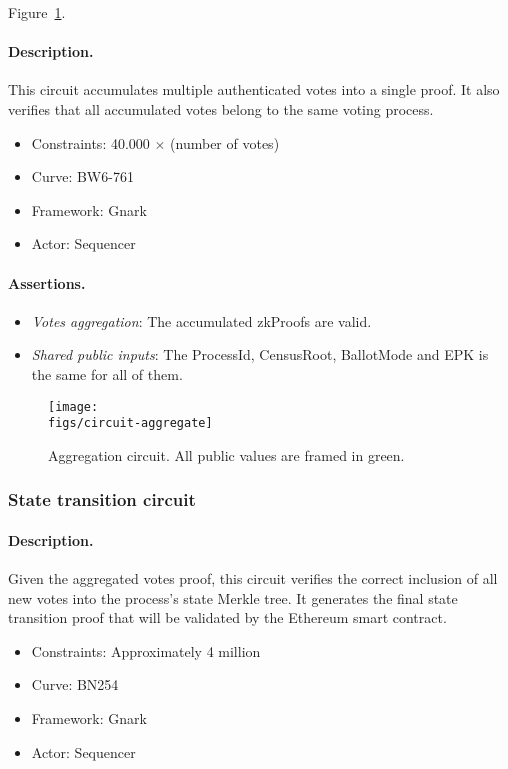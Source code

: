 Figure~\ref{fig:circuit-aggregate}.

\paragraph{Description.} This circuit accumulates multiple authenticated votes into a single proof. It also verifies that all accumulated votes belong to the same voting process.

\begin{itemize}
	\item Constraints: 40.000 $\times$ (number of votes)
	\item Curve: BW6-761
	\item Framework: Gnark
	\item Actor: Sequencer
\end{itemize}

\paragraph{Assertions.}

\begin{itemize}
	\item \emph{Votes aggregation}: The accumulated zkProofs are valid.
	\item \emph{Shared public inputs}: The ProcessId, CensusRoot, BallotMode and EPK is the same for all of them.
\end{itemize}

\begin{figure}[h]
	\centerline{\texttt{[image: \\figs/circuit-aggregate]}}
	\caption{Aggregation circuit. All public values are framed in green.}
	\label{fig:circuit-aggregate}
\end{figure}


\subsubsection{State transition circuit}

\paragraph{Description.} Given the aggregated votes proof, this circuit verifies the correct inclusion of all new votes into the process's state Merkle tree. It generates the final state transition proof that will be validated by the Ethereum smart contract.

\begin{itemize}
	\item Constraints: Approximately 4 million
	\item Curve: BN254
	\item Framework: Gnark
	\item Actor: Sequencer
\end{itemize}

